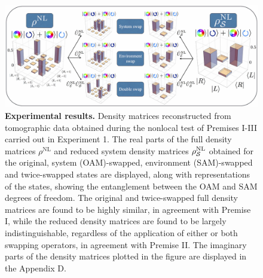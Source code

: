 \documentclass[12pt]{iopart}
\begin{document}
%
\begin{figure}[t]
	\centering
	\includegraphics[width=\columnwidth]{fig3.jpg}
	\caption{{\bf Experimental results.} Density matrices reconstructed from tomographic data obtained during the nonlocal test of Premises I-III carried out in Experiment 1. The real parts of the full density matrices $\rho^\mathrm{NL}$ and reduced system density matrices $\rho^\mathrm{NL}_{\cal S}$ obtained for the original, system (OAM)-swapped, environment (SAM)-swapped and twice-swapped states are displayed, along with  representations of the states, showing the entanglement between the OAM and SAM degrees of freedom. The original and twice-swapped full density matrices are found to be highly similar, in agreement with Premise I, while the reduced density matrices are found to be largely indistinguishable, regardless of the application of either or both swapping operators, in agreement with Premise II. The imaginary parts of the density matrices plotted in the figure are displayed in the Appendix D.}%
	\label{fig:fig3}
\end{figure}
%
\end{document}
